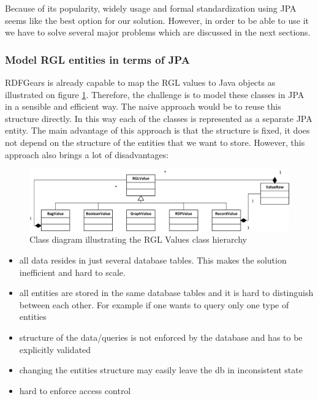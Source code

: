 Because of its popularity, widely usage and formal standardization using JPA seems like the best option for our solution. However, in order to be able to use it we have to solve several major problems which are discussed in the next sections.


\subsubsection{Model RGL entities in terms of JPA}
RDFGears is already capable to map the RGL values to Java objects as illustrated on figure \ref{fig_rglValuesClassDiag}. Therefore, the challenge is to model these classes in JPA in a sensible and efficient way. The naive approach would be to reuse this structure directly. In this way each of the classes is represented as a separate JPA entity. The main advantage of this approach is that the structure is fixed, it does not depend on the structure of the entities that we want to store. However, this approach also brings a lot of disadvantages: 

\begin{figure}[h!]
  \centering
  	\includegraphics[scale=0.8]{storage/diagrams/RGLValues.png}
  \caption{Class diagram illustrating the RGL Values class hierarchy}
  \label{fig_rglValuesClassDiag}
\end{figure}

\begin{itemize}
	\item all data resides in just several database tables. This makes the solution inefficient and hard to scale.
	\item all entities are stored in the same database tables and it is hard to distinguish between each other. For example if one wants to query only one type of entities
	\item structure of the data/queries is not enforced by the database and has to be explicitly validated
	\item changing the entities structure may easily leave the db in inconsistent state
	\item hard to enforce access control
\end{itemize}

